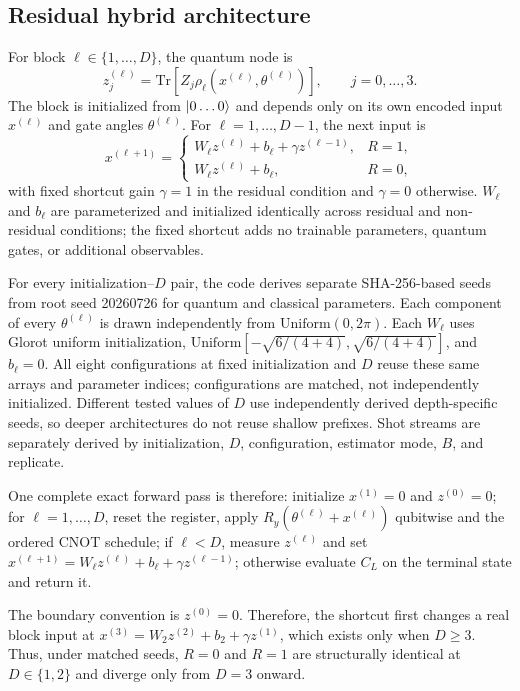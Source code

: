 \documentclass[pdflatex,sn-basic,Numbered]{sn-jnl}
\begin{document}
\subsection{Residual hybrid architecture}
\label{sec:residual-arch}

For block $\ell\in\{1,\ldots,D\}$, the quantum node is
\[
z_j^{(\ell)}
=\mathrm{Tr}\!\left[Z_j\rho_\ell
  \!\left(x^{(\ell)},\theta^{(\ell)}\right)\right],
\qquad j=0,\ldots,3.
\]
The block is initialized from $\ket{0\ldots0}$ and depends only on its own encoded input $x^{(\ell)}$ and gate angles $\theta^{(\ell)}$. For $\ell=1,\ldots,D-1$, the next input is
\[
x^{(\ell+1)}=
\begin{cases}
W_\ell z^{(\ell)}+b_\ell+\gamma z^{(\ell-1)}, & R=1,\\[3pt]
W_\ell z^{(\ell)}+b_\ell, & R=0,
\end{cases}
\]
with fixed shortcut gain $\gamma=1$ in the residual condition and $\gamma=0$ otherwise. $W_\ell$ and $b_\ell$ are parameterized and initialized identically across residual and non-residual conditions; the fixed shortcut adds no trainable parameters, quantum gates, or additional observables.

For every initialization--$D$ pair, the code derives separate SHA-256-based seeds from root seed 20260726 for quantum and classical parameters. Each component of every $\theta^{(\ell)}$ is drawn independently from $\mathrm{Uniform}(0,2\pi)$. Each $W_\ell$ uses Glorot uniform initialization, $\mathrm{Uniform}[-\sqrt{6/(4+4)},\sqrt{6/(4+4)}]$, and $b_\ell=0$. All eight configurations at fixed initialization and $D$ reuse these same arrays and parameter indices; configurations are matched, not independently initialized. Different tested values of $D$ use independently derived depth-specific seeds, so deeper architectures do not reuse shallow prefixes. Shot streams are separately derived by initialization, $D$, configuration, estimator mode, $B$, and replicate.

One complete exact forward pass is therefore: initialize $x^{(1)}=0$ and $z^{(0)}=0$; for $\ell=1,\ldots,D$, reset the register, apply $R_y(\theta^{(\ell)}+x^{(\ell)})$ qubitwise and the ordered CNOT schedule; if $\ell<D$, measure $z^{(\ell)}$ and set $x^{(\ell+1)}=W_\ell z^{(\ell)}+b_\ell+\gamma z^{(\ell-1)}$; otherwise evaluate $C_L$ on the terminal state and return it.

The boundary convention is $z^{(0)}=0$. Therefore, the shortcut first changes a real block input at $x^{(3)}=W_2z^{(2)}+b_2+\gamma z^{(1)}$, which exists only when $D\ge3$. Thus, under matched seeds, $R=0$ and $R=1$ are structurally identical at $D\in\{1,2\}$ and diverge only from $D=3$ onward.
\end{document}
